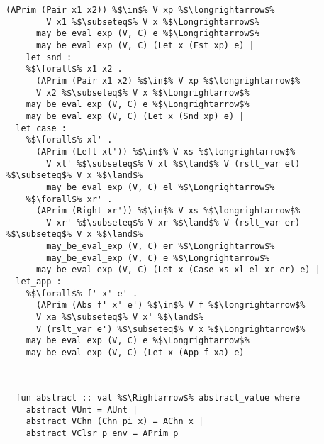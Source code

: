 \documentclass{article}
\begin{document}
\begin{lstlisting}[style=codestyle1, escapechar=\%]
        (APrim (Pair x1 x2)) %$\in$% V xp %$\longrightarrow$%
        V x1 %$\subseteq$% V x %$\Longrightarrow$% 
      may_be_eval_exp (V, C) e %$\Longrightarrow$% 
      may_be_eval_exp (V, C) (Let x (Fst xp) e) |
    let_snd : 
    %$\forall$% x1 x2 .
      (APrim (Pair x1 x2) %$\in$% V xp %$\longrightarrow$%
      V x2 %$\subseteq$% V x %$\Longrightarrow$% 
    may_be_eval_exp (V, C) e %$\Longrightarrow$% 
    may_be_eval_exp (V, C) (Let x (Snd xp) e) |
  let_case :
    %$\forall$% xl' .
      (APrim (Left xl')) %$\in$% V xs %$\longrightarrow$%
        V xl' %$\subseteq$% V xl %$\land$% V (rslt_var el) %$\subseteq$% V x %$\land$%
        may_be_eval_exp (V, C) el %$\Longrightarrow$%
    %$\forall$% xr' .
      (APrim (Right xr')) %$\in$% V xs %$\longrightarrow$%
        V xr' %$\subseteq$% V xr %$\land$% V (rslt_var er) %$\subseteq$% V x %$\land$%
        may_be_eval_exp (V, C) er %$\Longrightarrow$%
        may_be_eval_exp (V, C) e %$\Longrightarrow$% 
      may_be_eval_exp (V, C) (Let x (Case xs xl el xr er) e) |
  let_app :
    %$\forall$% f' x' e' .
      (APrim (Abs f' x' e') %$\in$% V f %$\longrightarrow$%
      V xa %$\subseteq$% V x' %$\land$%
      V (rslt_var e') %$\subseteq$% V x %$\Longrightarrow$% 
    may_be_eval_exp (V, C) e %$\Longrightarrow$% 
    may_be_eval_exp (V, C) (Let x (App f xa) e)

  \end{lstlisting}
\begin{lstlisting}[style=codestyle1, escapechar=\%]


  fun abstract :: val %$\Rightarrow$% abstract_value where
    abstract VUnt = AUnt |
    abstract VChn (Chn pi x) = AChn x |
    abstract VClsr p env = APrim p

  \end{lstlisting}
\end{document}
